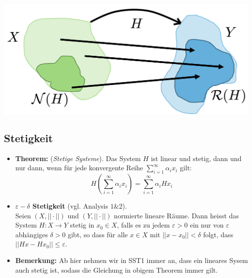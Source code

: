 \documentclass[11pt]{article}
\begin{document}
\begin{center}
    \includegraphics[width = 0.7\linewidth]{docimgs/Bildraum_Nullraum.png}
\end{center}


\subsection*{Stetigkeit}
\vspace*{-0.5cm}
\begin{itemize}[leftmargin = 0pt]
    \item[] \textbf{Theorem:} (\textit{Stetige Systeme}). Das System $H$ ist linear und stetig, dann und nur dann, wenn für jede konvergente Reihe $\sum_{i=1}^\infty \alpha_i x_i$ gilt:
    $$H\left( \sum_{i=1}^\infty \alpha_i x_i \right) = \sum_{i=1}^\infty \alpha_i H x_i$$
    \item[] \textbf{$\varepsilon-\delta$ Stetigkeit} (vgl. Analysis $1 \& 2$).\\Seien $(X, ||\cdot||)$ und $(Y, ||\cdot||)$ normierte lineare Räume. Dann heisst das System $H:X \to Y$ stetig in $x_0 \in X$, falls es zu jedem $\varepsilon > 0$ ein nur von $\varepsilon$ abhängiges $\delta >0$ gibt, so dass für alle $x\in X$ mit $||x-x_0||<\delta$ folgt, dass $||Hx-Hx_0||\leq \varepsilon$.
    \item[] \textbf{Bemerkung:} Ab hier nehmen wir in SST1 immer an, dass ein lineares Sysem auch stetig ist, sodass die Gleichung in obigem Theorem immer gilt.
\end{itemize}

\vfill \null
\pagebreak
\end{document}
